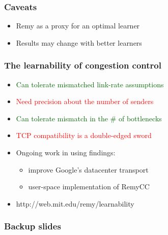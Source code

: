 \documentclass[svgnames]{beamer}
\begin{document}
\begin{Large}








 



\begin{frame}
\frametitle{Caveats}
\begin{itemize}
\item<2-> Remy as a proxy for an optimal learner
\item<3-> Results may change with better learners
\end{itemize}
\end{frame}

\begin{frame}
\frametitle{The learnability of congestion control}
\noindent
\begin{itemize}
\item<2-> \textcolor{darkgreen}{Can tolerate mismatched link-rate assumptions}
\item<3-> \textcolor{red}{Need precision about the number of senders}
\item<4-> \textcolor{darkgreen}{Can tolerate mismatch in the \# of bottlenecks}
\item<5-> \textcolor{red}{TCP compatibility is a double-edged sword}
\item<6-> Ongoing work in using findings:
\begin{itemize}
\item<7-> improve Google's datacenter transport
\item<8-> user-space implementation of RemyCC
\end{itemize}
\item<9-> http://web.mit.edu/remy/learnability
\end{itemize}
\end{frame}

\end{Large}

\begin{frame}[noframenumbering]
\frametitle{Backup slides}
\end{frame}

\end{document}
